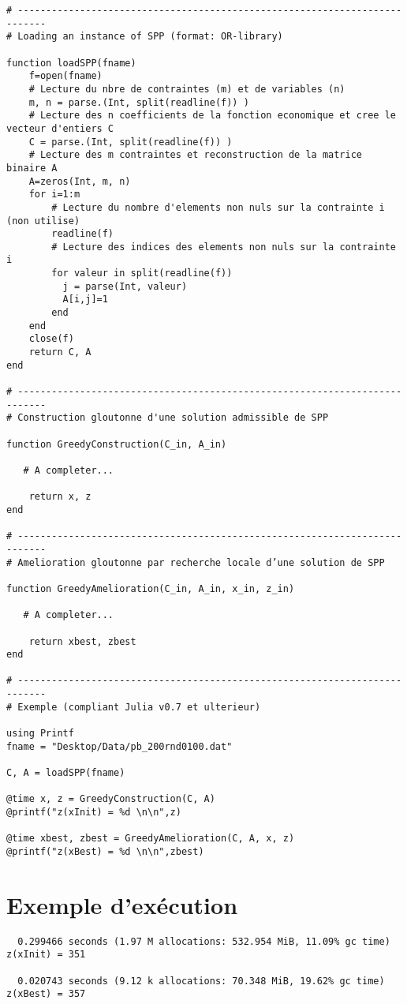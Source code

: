 \documentclass[10pt]{article}
\begin{document}
{
\begin{lstlisting}
# --------------------------------------------------------------------------- 
# Loading an instance of SPP (format: OR-library)

function loadSPP(fname)
    f=open(fname)
    # Lecture du nbre de contraintes (m) et de variables (n)
    m, n = parse.(Int, split(readline(f)) )
    # Lecture des n coefficients de la fonction economique et cree le vecteur d'entiers C
    C = parse.(Int, split(readline(f)) )
    # Lecture des m contraintes et reconstruction de la matrice binaire A
    A=zeros(Int, m, n)
    for i=1:m
        # Lecture du nombre d'elements non nuls sur la contrainte i (non utilise)
        readline(f)
        # Lecture des indices des elements non nuls sur la contrainte i
        for valeur in split(readline(f))
          j = parse(Int, valeur)
          A[i,j]=1
        end
    end
    close(f)
    return C, A
end

# --------------------------------------------------------------------------- 
# Construction gloutonne d'une solution admissible de SPP

function GreedyConstruction(C_in, A_in)

   # A completer...
   
    return x, z
end

# --------------------------------------------------------------------------- 
# Amelioration gloutonne par recherche locale d’une solution de SPP

function GreedyAmelioration(C_in, A_in, x_in, z_in)

   # A completer...
   
    return xbest, zbest
end

# --------------------------------------------------------------------------- 
# Exemple (compliant Julia v0.7 et ulterieur)

using Printf
fname = "Desktop/Data/pb_200rnd0100.dat"

C, A = loadSPP(fname)

@time x, z = GreedyConstruction(C, A)
@printf("z(xInit) = %d \n\n",z)

@time xbest, zbest = GreedyAmelioration(C, A, x, z)
@printf("z(xBest) = %d \n\n",zbest)
\end{lstlisting}
}
%
%
\section{Exemple d'exécution}

\begin{verbatim}
  0.299466 seconds (1.97 M allocations: 532.954 MiB, 11.09% gc time)
z(xInit) = 351 

  0.020743 seconds (9.12 k allocations: 70.348 MiB, 19.62% gc time)
z(xBest) = 357 
\end{verbatim}
\end{document}
